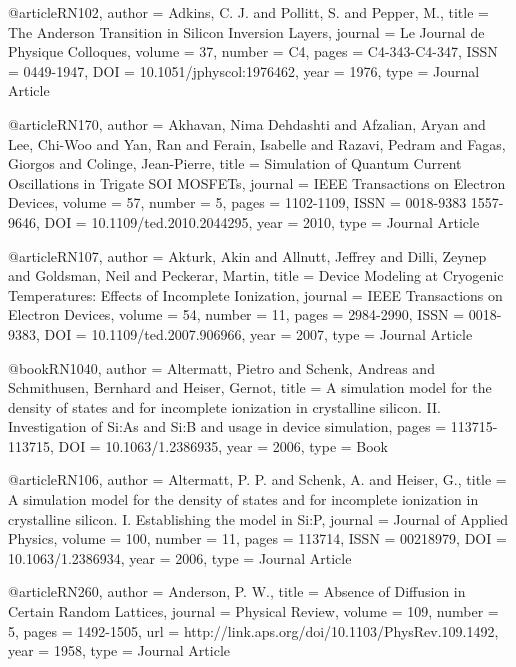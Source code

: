 ﻿@article{RN102,
   author = {Adkins, C. J. and Pollitt, S. and Pepper, M.},
   title = {The Anderson Transition in Silicon Inversion Layers},
   journal = {Le Journal de Physique Colloques},
   volume = {37},
   number = {C4},
   pages = {C4-343-C4-347},
   ISSN = {0449-1947},
   DOI = {10.1051/jphyscol:1976462},
   year = {1976},
   type = {Journal Article}
}

@article{RN170,
   author = {Akhavan, Nima Dehdashti and Afzalian, Aryan and Lee, Chi-Woo and Yan, Ran and Ferain, Isabelle and Razavi, Pedram and Fagas, Giorgos and Colinge, Jean-Pierre},
   title = {Simulation of Quantum Current Oscillations in Trigate SOI MOSFETs},
   journal = {IEEE Transactions on Electron Devices},
   volume = {57},
   number = {5},
   pages = {1102-1109},
   ISSN = {0018-9383
1557-9646},
   DOI = {10.1109/ted.2010.2044295},
   year = {2010},
   type = {Journal Article}
}

@article{RN107,
   author = {Akturk, Akin and Allnutt, Jeffrey and Dilli, Zeynep and Goldsman, Neil and Peckerar, Martin},
   title = {Device Modeling at Cryogenic Temperatures: Effects of Incomplete Ionization},
   journal = {IEEE Transactions on Electron Devices},
   volume = {54},
   number = {11},
   pages = {2984-2990},
   ISSN = {0018-9383},
   DOI = {10.1109/ted.2007.906966},
   year = {2007},
   type = {Journal Article}
}

@book{RN1040,
   author = {Altermatt, Pietro and Schenk, Andreas and Schmithusen, Bernhard and Heiser, Gernot},
   title = {A simulation model for the density of states and for incomplete ionization in crystalline silicon. II. Investigation of Si:As and Si:B and usage in device simulation},
   pages = {113715-113715},
   DOI = {10.1063/1.2386935},
   year = {2006},
   type = {Book}
}

@article{RN106,
   author = {Altermatt, P. P. and Schenk, A. and Heiser, G.},
   title = {A simulation model for the density of states and for incomplete ionization in crystalline silicon. I. Establishing the model in Si:P},
   journal = {Journal of Applied Physics},
   volume = {100},
   number = {11},
   pages = {113714},
   ISSN = {00218979},
   DOI = {10.1063/1.2386934},
   year = {2006},
   type = {Journal Article}
}

@article{RN260,
   author = {Anderson, P. W.},
   title = {Absence of Diffusion in Certain Random Lattices},
   journal = {Physical Review},
   volume = {109},
   number = {5},
   pages = {1492-1505},
   url = {http://link.aps.org/doi/10.1103/PhysRev.109.1492},
   year = {1958},
   type = {Journal Article}
}

